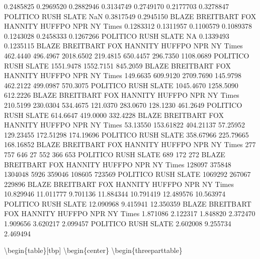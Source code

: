 \documentclass[english,,man]{apa6}
\begin{document}
0.2485825 0.2969520 0.2882946 0.3134749 0.2749170 0.2177703 0.3278847
POLITICO RUSH SLATE
NaN 0.3817549 0.2945150
BLAZE BREITBART FOX HANNITY HUFFPO NPR NY Times
0.1283312 0.1311957 0.1100579 0.1089378 0.1243028 0.2458333 0.1267266
POLITICO RUSH SLATE
NA 0.1339493 0.1235115
BLAZE BREITBART FOX HANNITY HUFFPO NPR NY Times
462.4440 496.4967 2018.6502 219.4815 650.4457 296.7350 1108.0689
POLITICO RUSH SLATE
1551.9478 1552.7151 845.2059
BLAZE BREITBART FOX HANNITY HUFFPO NPR NY Times
149.6635 609.9120 2709.7690 145.9798 462.2122 499.0987 570.3075
POLITICO RUSH SLATE
1045.4670 1258.5090 612.2226
BLAZE BREITBART FOX HANNITY HUFFPO NPR NY Times
210.5199 230.0304 534.4675 121.0370 283.0670 128.1230 461.2649
POLITICO RUSH SLATE
614.6647 419.0000 332.4228
BLAZE BREITBART FOX HANNITY HUFFPO NPR NY Times
53.13550 153.61822 404.21137 57.25952 129.23455 172.51298 174.19696
POLITICO RUSH SLATE
358.67966 225.79665 168.16852
BLAZE BREITBART FOX HANNITY HUFFPO NPR NY Times
277 757 646 27 552 366 653
POLITICO RUSH SLATE
689 172 272
BLAZE BREITBART FOX HANNITY HUFFPO NPR NY Times
128097 375848 1304048 5926 359046 108605 723569
POLITICO RUSH SLATE
1069292 267067 229896
BLAZE BREITBART FOX HANNITY HUFFPO NPR NY Times
10.829946 11.011777 9.701136 11.884344 10.791419 12.489576 10.563974
POLITICO RUSH SLATE
12.090968 9.415941 12.350359
BLAZE BREITBART FOX HANNITY HUFFPO NPR NY Times
1.871086 2.122317 1.848820 2.372470 1.909656 3.620217 2.099457
POLITICO RUSH SLATE
2.602008 9.255734 2.469494

\textbackslash{}begin\{table\}{[}tbp{]}
\textbackslash{}begin\{center\}
\textbackslash{}begin\{threeparttable\}

\caption{\label{tab:exp2_source_descriptives_kav}}
\end{document}
